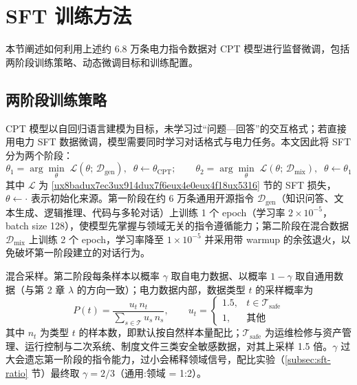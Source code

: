 \documentclass[fontset=fandol,type=master,campus=shenzhen,etitleauto=true]{hithesisbook}
\begin{document}
\section{SFT 训练方法}\label{sec:sft-train}

本节阐述如何利用上述约 6.8 万条电力指令数据对 CPT 模型进行监督微调，包括两阶段训练策略、动态微调目标和训练配置。

\subsection{两阶段训练策略}\label{ux4e24ux9636ux6bb5-sft-ux7b56ux7565}

CPT 模型以自回归语言建模为目标，未学习过“问题—回答”的交互格式；若直接用电力 SFT 数据微调，模型需要同时学习对话格式与电力任务。本文因此将 SFT 分为两个阶段：
\begin{equation}\label{eq:sft-stage}
\theta_1 = \arg\min_{\theta} \; \mathcal{L}(\theta;\, \mathcal{D}_{\text{gen}}), \;\; \theta \leftarrow \theta_{\text{CPT}}; \qquad
\theta_2 = \arg\min_{\theta} \; \mathcal{L}(\theta;\, \mathcal{D}_{\text{mix}}), \;\; \theta \leftarrow \theta_1
\end{equation}
其中 $\mathcal{L}$ 为 \ref{ux8badux7ec3ux914dux7f6eux4e0eux4f18ux5316} 节的 SFT 损失，$\theta \leftarrow \cdot$ 表示初始化来源。第一阶段在约 6 万条通用开源指令 $\mathcal{D}_{\text{gen}}$（知识问答、文本生成、逻辑推理、代码与多轮对话）上训练 1 个 epoch（学习率 $2 \times 10^{-5}$，batch size 128），使模型先掌握与领域无关的指令遵循能力；第二阶段在混合数据 $\mathcal{D}_{\text{mix}}$ 上训练 2 个 epoch，学习率降至 $1 \times 10^{-5}$ 并采用带 warmup 的余弦退火，以免破坏第一阶段建立的对话行为。

混合采样。第二阶段每条样本以概率 $\gamma$ 取自电力数据、以概率 $1 - \gamma$ 取自通用数据（与第 2 章 $\lambda$ 的方向一致）；电力数据内部，数据类型 $t$ 的采样概率为
\begin{equation}\label{eq:sft-sampling}
P(t) = \frac{u_t\, n_t}{\sum_{s \in \mathcal{T}} u_s\, n_s}, \qquad
u_t = \begin{cases} 1.5, & t \in \mathcal{T}_{\text{safe}} \\ 1, & \text{其他} \end{cases}
\end{equation}
其中 $n_t$ 为类型 $t$ 的样本数，即默认按自然样本量配比；$\mathcal{T}_{\text{safe}}$ 为运维检修与资产管理、运行控制与二次系统、制度文件三类安全敏感数据，对其上采样 1.5 倍。$\gamma$ 过大会遗忘第一阶段的指令能力，过小会稀释领域信号，配比实验（\ref{subsec:sft-ratio} 节）最终取 $\gamma = 2/3$（通用:领域 = 1:2）。
\end{document}
